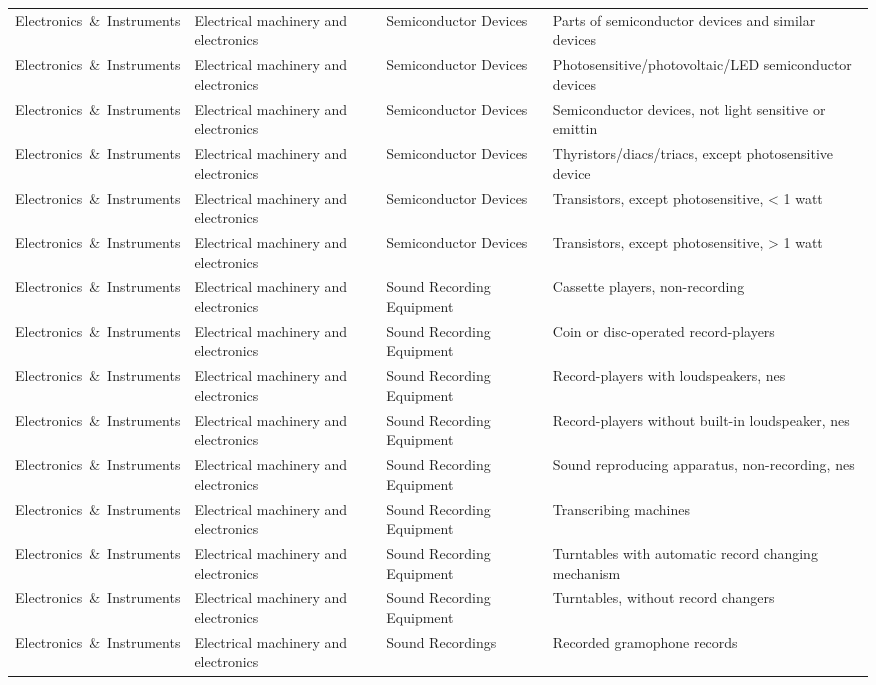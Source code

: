 \begin{appendices}
\begin{xltabular}{\textwidth}{|p{0.14\textwidth}|p{0.28\textwidth}|p{0.18\textwidth}|p{0.30\textwidth}|}
Electronics\ \&\ Instruments & Electrical machinery and electronics & Semiconductor Devices & Parts of semiconductor devices and similar devices \\
Electronics\ \&\ Instruments & Electrical machinery and electronics & Semiconductor Devices & Photosensitive/photovoltaic/LED semiconductor devices \\
Electronics\ \&\ Instruments & Electrical machinery and electronics & Semiconductor Devices & Semiconductor devices, not light sensitive or emittin \\
Electronics\ \&\ Instruments & Electrical machinery and electronics & Semiconductor Devices & Thyristors/diacs/triacs, except photosensitive device \\
Electronics\ \&\ Instruments & Electrical machinery and electronics & Semiconductor Devices & Transistors, except photosensitive, < 1 watt \\
Electronics\ \&\ Instruments & Electrical machinery and electronics & Semiconductor Devices & Transistors, except photosensitive, > 1 watt \\
Electronics\ \&\ Instruments & Electrical machinery and electronics & Sound Recording Equipment & Cassette players, non-recording \\
Electronics\ \&\ Instruments & Electrical machinery and electronics & Sound Recording Equipment & Coin or disc-operated record-players \\
Electronics\ \&\ Instruments & Electrical machinery and electronics & Sound Recording Equipment & Record-players with loudspeakers, nes \\
Electronics\ \&\ Instruments & Electrical machinery and electronics & Sound Recording Equipment & Record-players without built-in loudspeaker, nes \\
Electronics\ \&\ Instruments & Electrical machinery and electronics & Sound Recording Equipment & Sound reproducing apparatus, non-recording, nes \\
Electronics\ \&\ Instruments & Electrical machinery and electronics & Sound Recording Equipment & Transcribing machines \\
Electronics\ \&\ Instruments & Electrical machinery and electronics & Sound Recording Equipment & Turntables with automatic record changing mechanism \\
Electronics\ \&\ Instruments & Electrical machinery and electronics & Sound Recording Equipment & Turntables, without record changers \\
Electronics\ \&\ Instruments & Electrical machinery and electronics & Sound Recordings & Recorded gramophone records \\

\end{xltabular}
\end{appendices}
